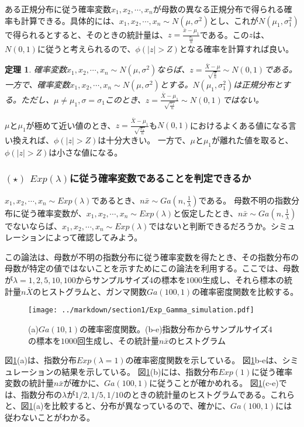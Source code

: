 \documentclass[a4paper,11pt,dvipdfmx]{jsarticle}
\newtheorem{theo}{定理}[section]
\begin{document}
ある正規分布に従う確率変数$x_1,x_2,\cdots,x_n$が母数の異なる正規分布で得られる確率も計算できる。具体的には、$x_1,x_2,\cdots,x_n\sim N(\mu,\sigma^2)$とし、これが$N(\mu_1,\sigma_1^2)$で得られるとすると、そのときの統計量は、$z=\frac{\bar{x}-\mu_1}{\frac{\sigma_1}{n}}$である。この$z$は、$N(0,1)$に従うと考えられるので、$\phi(|z|>Z)$となる確率を計算すれば良い。

\begin{theo}
    確率変数$x_1,x_2,\cdots,x_n \sim N(\mu,\sigma^2)$ならば、$z=\frac{\bar{X}-\mu}{\sqrt{\frac{\sigma}{n}}} \sim N(0,1)$である。
    一方で、確率変数$x_1,x_2,\cdots,x_n \sim N(\mu,\sigma^2)$とする。$N(\mu_1,\sigma_1^2)$は正規分布とする。ただし、$\mu\neq \mu_1, \sigma =\sigma_1$このとき、$z=\frac{\bar{X}-\mu_1}{\sqrt{\frac{\sigma_1}{n}}} \sim N(0,1)$ではない。
\end{theo}
$\mu$と$ \mu_1$が極めて近い値のとき、$z=\frac{\bar{X}-\mu_1}{\sqrt{\frac{\sigma_1}{n}}} $も$N(0,1)$におけるよくある値になる言い換えれば、$\phi(|z|>Z)$は十分大きい。
一方で、$\mu$と$ \mu_1$が離れた値を取ると、$\phi(|z|>Z)$は小さな値になる。


\subsubsection{$(\star)$ $Exp(\lambda)$に従う確率変数であることを判定できるか}
$x_1,x_2,\cdots,x_n \sim Exp(\lambda)$であるとき、$n\bar{x}\sim Ga(n,\frac{1}{\lambda})$である。
母数不明の指数分布に従う確率変数が、$x_1,x_2,\cdots,x_n \sim Exp(\lambda)$と仮定したとき、$n\bar{x}\sim Ga(n,\frac{1}{\lambda})$でないならば、$x_1,x_2,\cdots,x_n \sim Exp(\lambda)$ではないと判断できるだろうか。シミュレーションによって確認してみよう。

この論法は、母数が不明の指数分布に従う確率変数を得たとき、その指数分布の母数が特定の値ではないことを示すためにこの論法を利用する。ここでは、母数が$\lambda=1,2,5,10,100$からサンプルサイズ4の標本を$1000$生成し、それら標本の統計量$n\bar{X}$のヒストグラムと、ガンマ関数$Ga(100,1)$の確率密度関数を比較する。

\begin{figure}
    \centering
    \texttt{[image: ../markdown/section1/Exp\_Gamma\_simulation.pdf]}
    \caption{(a)$Ga(10,1)$の確率密度関数。(b-e)指数分布からサンプルサイズ$4$の標本を$1000$回生成し、その統計量$n\bar{x}$のヒストグラム}
    \label{fig:exp_gamma_simulation}
\end{figure}

図\ref{fig:exp_gamma_simulation}(a)は、指数分布$Exp(\lambda=1)$の確率密度関数を示している。
図\ref{fig:exp_gamma_simulation}b-eは、シミュレーションの結果を示している。
図\ref{fig:exp_gamma_simulation}(b)には、指数分布$Exp(1)$に従う確率変数の統計量$n\bar{x}$が確かに、$Ga(100,1)$に従うことが確かめれる。
図\ref{fig:exp_gamma_simulation}(c-e)では、指数分布の$\lambda$が$1/2,1/5,1/10$のときの統計量のヒストグラムである。これらと、図\ref{fig:exp_gamma_simulation}(a)を比較すると、分布が異なっているので、確かに、$Ga(100,1)$には従わないことがわかる。
\end{document}
